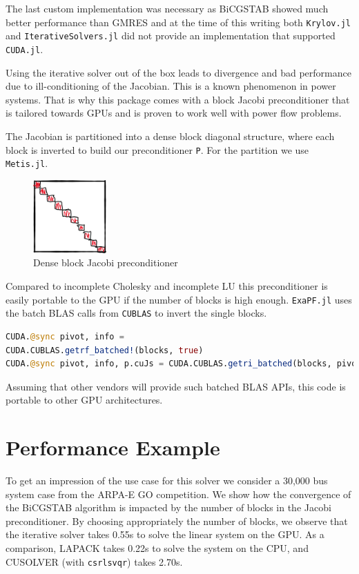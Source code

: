 \documentclass{juliacon}
\begin{document}
The last custom implementation was necessary as BiCGSTAB showed much better
performance than GMRES and at the time of this writing both \lstinline{Krylov.jl} and
\lstinline{IterativeSolvers.jl} did not provide an implementation that supported
\lstinline{CUDA.jl}.

Using the iterative solver out of the box leads to divergence and bad performance due to
ill-conditioning of the Jacobian. This is a known phenomenon in power
systems. That is why this package comes with a block Jacobi preconditioner
that is tailored towards GPUs and is proven to work well with power flow
problems.

The Jacobian is partitioned into a dense block diagonal structure, where each block is inverted to build our preconditioner \lstinline{P}. For the partition we use \lstinline{Metis.jl}.

\begin{figure}
    \centering
    \includegraphics[width=0.25\textwidth]{figures/gpublocks.png}
    \caption{Dense block Jacobi preconditioner}
    \label{fig:preconditioner}
\end{figure}

Compared to incomplete Cholesky and incomplete LU this preconditioner is easily portable to the GPU if the number of blocks is high enough. \lstinline{ExaPF.jl} uses the batch BLAS calls from \lstinline{CUBLAS} to invert the single blocks.

\begin{lstlisting}[language = Julia]
CUDA.@sync pivot, info = 
CUDA.CUBLAS.getrf_batched!(blocks, true)
CUDA.@sync pivot, info, p.cuJs = CUDA.CUBLAS.getri_batched(blocks, pivot)
\end{lstlisting}

Assuming that other vendors will provide such batched BLAS APIs, this code is portable to other GPU architectures.

\section{Performance Example}

To get an impression of the use case for this solver we consider a 30,000 bus system case from the ARPA-E GO competition.
We show how the convergence of the BiCGSTAB algorithm is impacted by the number of blocks in the Jacobi preconditioner.
By choosing appropriately the number of blocks, we observe that the iterative solver
takes 0.55s to solve the linear system on the GPU. As a comparison,
LAPACK takes 0.22s to solve the system on the CPU, and CUSOLVER (with \lstinline{csrlsvqr})
takes 2.70s.
\end{document}
